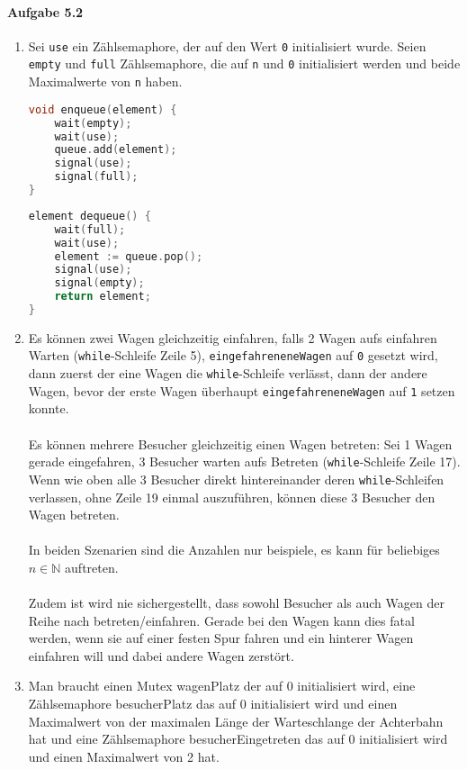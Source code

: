 \documentclass[11pt]{article}
\begin{document}
\paragraph{Aufgabe 5.2}
\begin{enumerate}[label=\alph*)]
\item Sei \verb|use| ein Zählsemaphore, der auf den Wert \verb|0| initialisiert wurde. Seien \verb|empty| und \verb|full| Zählsemaphore, die auf \verb|n| und \verb|0| initialisiert werden und beide Maximalwerte von \verb|n| haben.
\begin{lstlisting}[language=C]
void enqueue(element) {
	wait(empty);
	wait(use);
	queue.add(element);
	signal(use);
	signal(full);
}
\end{lstlisting}

\begin{lstlisting}[language=C]
element dequeue() {
	wait(full);
	wait(use);
	element := queue.pop();
	signal(use);
	signal(empty);
	return element;
}
\end{lstlisting}

\item Es können zwei Wagen gleichzeitig einfahren, falls 2 Wagen aufs einfahren Warten (\verb|while|-Schleife Zeile 5), \verb|eingefahreneneWagen| auf \verb|0| gesetzt wird, dann zuerst der eine Wagen die \verb|while|-Schleife verlässt, dann der andere Wagen, bevor der erste Wagen überhaupt \verb|eingefahreneneWagen| auf \verb|1| setzen konnte.
\\\\Es können mehrere Besucher gleichzeitig einen Wagen betreten: Sei 1 Wagen gerade eingefahren, 3 Besucher warten aufs Betreten (\verb|while|-Schleife Zeile 17). Wenn wie oben alle 3 Besucher direkt hintereinander deren \verb|while|-Schleifen verlassen, ohne Zeile 19 einmal auszuführen, können diese 3 Besucher den Wagen betreten.
\\\\In beiden Szenarien sind die Anzahlen nur beispiele, es kann für beliebiges $n\in\mathbb{N}$ auftreten.
\\\\Zudem ist wird nie sichergestellt, dass sowohl Besucher als auch Wagen der Reihe nach betreten/einfahren. Gerade bei den Wagen kann dies fatal werden, wenn sie auf einer festen Spur fahren und ein hinterer Wagen einfahren will und dabei andere Wagen zerstört.

\item Man braucht einen Mutex wagenPlatz der auf 0 initialisiert wird, eine Zählsemaphore besucherPlatz das auf 0 initialisiert wird und einen Maximalwert von der maximalen Länge der Warteschlange der Achterbahn hat und eine Zählsemaphore besucherEingetreten das auf 0 initialisiert wird und einen Maximalwert von 2 hat.


\end{enumerate}
\end{document}
